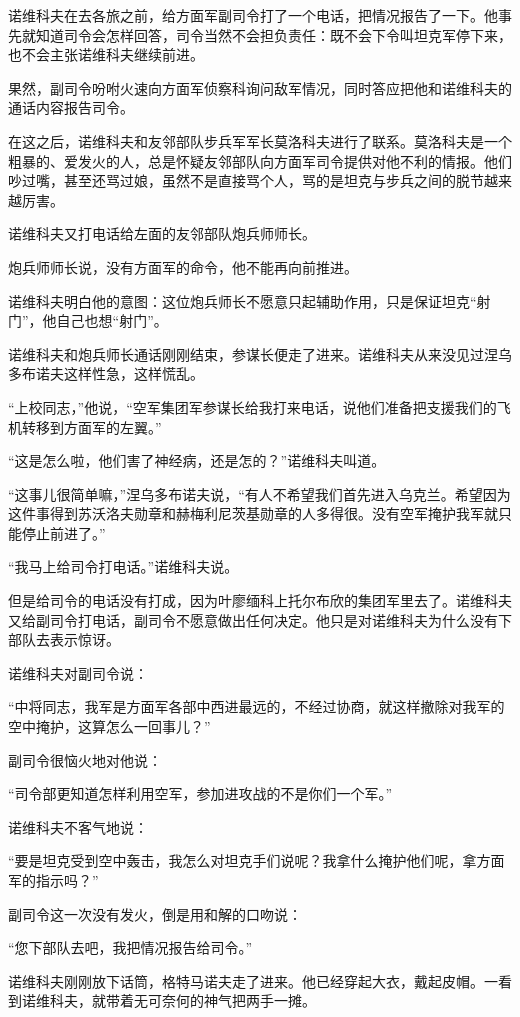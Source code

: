 诺维科夫在去各旅之前，给方面军副司令打了一个电话，把情况报告了一下。他事先就知道司令会怎样回答，司令当然不会担负责任：既不会下令叫坦克军停下来，也不会主张诺维科夫继续前进。

果然，副司令吩咐火速向方面军侦察科询问敌军情况，同时答应把他和诺维科夫的通话内容报告司令。

在这之后，诺维科夫和友邻部队步兵军军长莫洛科夫进行了联系。莫洛科夫是一个粗暴的、爱发火的人，总是怀疑友邻部队向方面军司令提供对他不利的情报。他们吵过嘴，甚至还骂过娘，虽然不是直接骂个人，骂的是坦克与步兵之间的脱节越来越厉害。

诺维科夫又打电话给左面的友邻部队炮兵师师长。

炮兵师师长说，没有方面军的命令，他不能再向前推进。

诺维科夫明白他的意图：这位炮兵师长不愿意只起辅助作用，只是保证坦克“射门”，他自己也想“射门”。

诺维科夫和炮兵师长通话刚刚结束，参谋长便走了进来。诺维科夫从来没见过涅乌多布诺夫这样性急，这样慌乱。

“上校同志，”他说，“空军集团军参谋长给我打来电话，说他们准备把支援我们的飞机转移到方面军的左翼。”

“这是怎么啦，他们害了神经病，还是怎的？”诺维科夫叫道。

“这事儿很简单嘛，”涅乌多布诺夫说，“有人不希望我们首先进入乌克兰。希望因为这件事得到苏沃洛夫勋章和赫梅利尼茨基勋章的人多得很。没有空军掩护我军就只能停止前进了。”

“我马上给司令打电话。”诺维科夫说。

但是给司令的电话没有打成，因为叶廖缅科上托尔布欣的集团军里去了。诺维科夫又给副司令打电话，副司令不愿意做出任何决定。他只是对诺维科夫为什么没有下部队去表示惊讶。

诺维科夫对副司令说：

“中将同志，我军是方面军各部中西进最远的，不经过协商，就这样撤除对我军的空中掩护，这算怎么一回事儿？”

副司令很恼火地对他说：

“司令部更知道怎样利用空军，参加进攻战的不是你们一个军。”

诺维科夫不客气地说：

“要是坦克受到空中轰击，我怎么对坦克手们说呢？我拿什么掩护他们呢，拿方面军的指示吗？”

副司令这一次没有发火，倒是用和解的口吻说：

“您下部队去吧，我把情况报告给司令。”

诺维科夫刚刚放下话筒，格特马诺夫走了进来。他已经穿起大衣，戴起皮帽。一看到诺维科夫，就带着无可奈何的神气把两手一摊。


